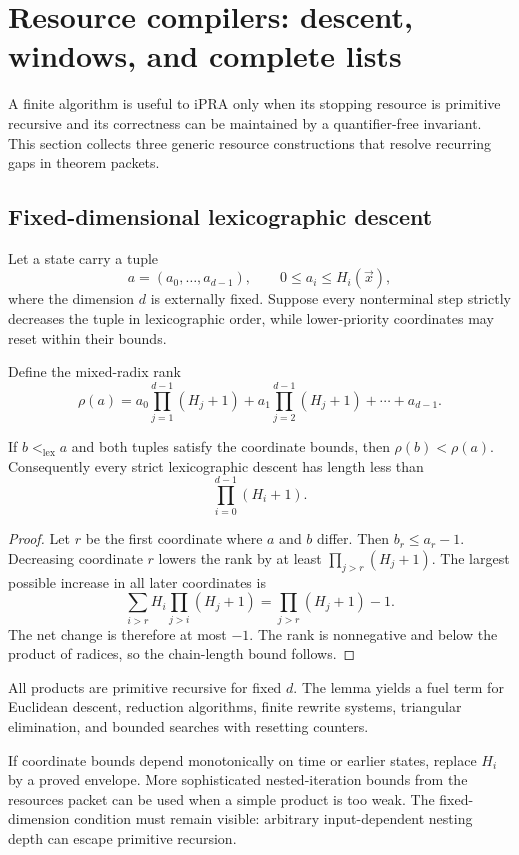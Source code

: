 \section{Resource compilers: descent, windows, and complete lists}
\label{sec:resources}

A finite algorithm is useful to iPRA only when its stopping resource is
primitive recursive and its correctness can be maintained by a
quantifier-free invariant.  This section collects three generic resource
constructions that resolve recurring gaps in theorem packets.

\subsection{Fixed-dimensional lexicographic descent}

Let a state carry a tuple
\[
  a=(a_0,\ldots,a_{d-1}),\qquad 0\leq a_i\leq H_i(\vec x),
\]
where the dimension \(d\) is externally fixed.  Suppose every nonterminal step
strictly decreases the tuple in lexicographic order, while lower-priority
coordinates may reset within their bounds.

Define the mixed-radix rank
\[
 \rho(a)=a_0\prod_{j=1}^{d-1}(H_j+1)
 +a_1\prod_{j=2}^{d-1}(H_j+1)+\cdots+a_{d-1}.
\]

\begin{lemma}
\label{lem:mixed-radix}
If \(b<_{\mathrm{lex}}a\) and both tuples satisfy the coordinate bounds, then
\(\rho(b)<\rho(a)\).  Consequently every strict lexicographic descent has
length less than
\[
  \prod_{i=0}^{d-1}(H_i+1).
\]
\end{lemma}

\begin{proof}
Let \(r\) be the first coordinate where \(a\) and \(b\) differ.  Then
\(b_r\leq a_r-1\).  Decreasing coordinate \(r\) lowers the rank by at least
\(\prod_{j>r}(H_j+1)\).  The largest possible increase in all later
coordinates is
\[
 \sum_{i>r}H_i\prod_{j>i}(H_j+1)
 =\prod_{j>r}(H_j+1)-1.
\]
The net change is therefore at most \(-1\).  The rank is nonnegative and below
the product of radices, so the chain-length bound follows.
\end{proof}

All products are primitive recursive for fixed \(d\).  The lemma yields a
fuel term for Euclidean descent, reduction algorithms, finite rewrite systems,
triangular elimination, and bounded searches with resetting counters.

If coordinate bounds depend monotonically on time or earlier states, replace
\(H_i\) by a proved envelope.  More sophisticated nested-iteration bounds from
the resources packet can be used when a simple product is too weak.  The
fixed-dimension condition must remain visible: arbitrary input-dependent
nesting depth can escape primitive recursion.

